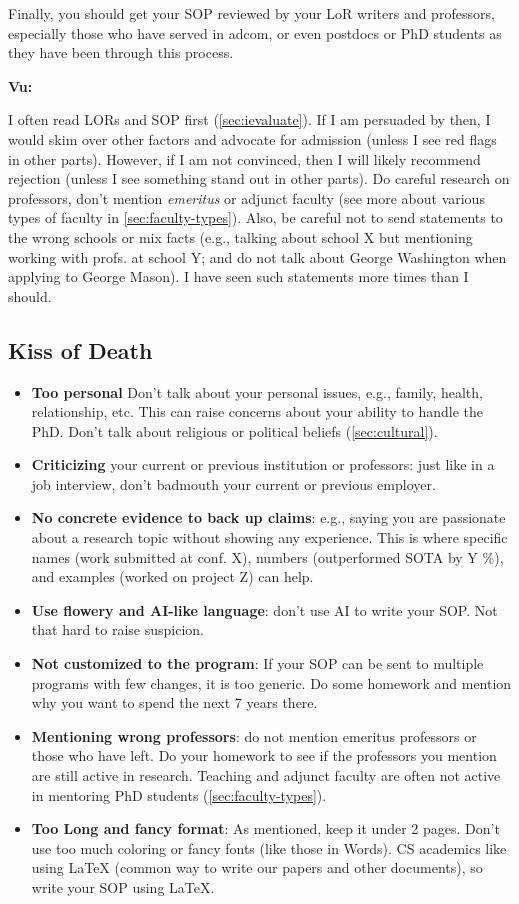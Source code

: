 \documentclass[oneside,11pt,dvipsnames]{book}
\newenvironment{commentbox}[1][]{
  \small
  \begin{mybox}
    {\small \textbf{#1}}
  }{
  \end{mybox}
}
\begin{document}
Finally, you should get your SOP reviewed by your LoR writers and professors, especially those who have served in adcom, or even postdocs or PhD students as they have been through this process.

\begin{commentbox}[Vu:]
  I often read LORs and SOP first (\autoref{sec:ievaluate}). If I am
  persuaded by then, I would skim over other factors and advocate for
  admission (unless I see red flags in other parts). However, if I am not
  convinced, then I will likely recommend rejection (unless I see
  something stand out in other parts).
  \tcblower
  Do careful research on professors, don't mention \emph{emeritus} or adjunct faculty (see more about various types of faculty in \autoref{sec:faculty-types}).
  Also, be careful not to send statements to the wrong schools or mix
  facts (e.g., talking about school X but mentioning working with
  profs. at school Y; and do not talk about George Washington when applying to George Mason). I have seen such statements more times than I should.
\end{commentbox}


\subsection{Kiss of Death} 

\begin{itemize}
\item \textbf{Too personal} Don't talk about your personal issues, e.g., family, health, relationship, etc. This can raise concerns about your ability to handle the PhD. Don't talk about religious or political beliefs (\autoref{sec:cultural}).
\item \textbf{Criticizing} your current or previous institution or professors: just like in a job interview, don't badmouth your current or previous employer. 
\item \textbf{No concrete evidence to back up claims}: e.g., saying you are passionate about a research topic without showing any experience. This is where specific names (work submitted at conf. X), numbers (outperformed SOTA by Y \%), and examples (worked on project Z) can help. 
\item \textbf{Use flowery and AI-like language}: don't use AI to write your SOP. Not that hard to raise suspicion.
\item \textbf{Not customized to the program}: If your SOP can be sent to multiple programs with few changes, it is too generic. Do some homework and mention why you want to spend the next 7 years there.
\item \textbf{Mentioning wrong professors}: do not mention emeritus professors or those who have left.  Do your homework to see if the professors you mention are still active in research.  Teaching and adjunct faculty are often not active in mentoring PhD students (\autoref{sec:faculty-types}).
\item \textbf{Too Long and fancy format}: As mentioned, keep it under 2 pages. Don't use too much coloring or fancy fonts (like those in Words). CS academics like using LaTeX (common way to write our papers and other documents), so write your SOP using LaTeX. 
\end{itemize}
\end{document}
